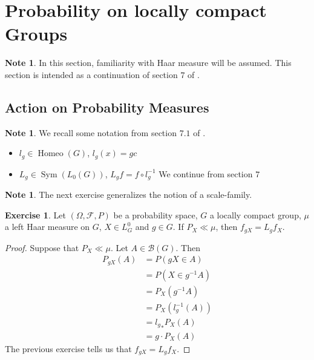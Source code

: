 \documentclass[12pt]{amsart}
\theoremstyle{definition}
\newtheorem{note}[definition]{Note}
\newtheorem{ex}[definition]{Exercise}
\newcommand{\Om}{\Omega}
\newcommand{\MB}{\mathcal{B}}
\newcommand{\MF}{\mathcal{F}}
\DeclareMathOperator{\Homeo}{Homeo}
\DeclareMathOperator{\Sym}{Sym}
\begin{document}
	
	
	
	
	
	
	
	
	








	\newpage	
	\section{Probability on locally compact Groups}
	
	\begin{note}
	In this section, familiarity with Haar measure will be assumed. This section is intended as a continuation of section $7$ of \cite{measure}.
	\end{note}
	
	
	\subsection{Action on Probability Measures}
	
	\begin{note}
	We recall some notation from section $7.1$ of \cite{measure}.
	\begin{itemize}
	\item $l_g \in \Homeo(G)$, $l_g(x) = gc$
	\item $L_g \in \Sym(L_0(G))$, $L_g f = f \circ l_g^{-1}$
	We continue from section $7$
	\end{itemize}
	\end{note}
	
	\begin{note}
	The next exercise generalizes the notion of a scale-family.
	\end{note}
	
	\begin{ex}
	Let $(\Om, \MF, P)$ be a probability space, $G$ a locally compact group, $\mu$ a left Haar measure on $G$, $X \in L^0_G$ and $g \in G$. If $P_X \ll \mu$, then $f_{gX} = L_g f_X$.
	\end{ex}
	
	\begin{proof}
	Suppose that $P_X \ll \mu$. Let $A \in \MB(G)$. Then 
	\begin{align*}
	P_{gX}(A) 
	&= P(gX \in A) \\
	&= P(X \in g^{-1}A) \\
	&= P_X(g^{-1}A) \\
	&= P_X(l_g^{-1}(A)) \\
	&= {l_g}_*P_X(A) \\
	&= g \cdot P_X(A)
	\end{align*}
	The previous exercise tells us that $f_{gX} = L_g f_X$.
	\end{proof}
	
\end{document}
